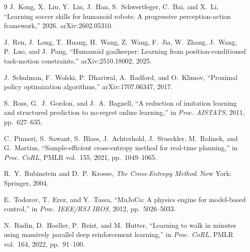 \documentclass{article}
\begin{document}
\begin{thebibliography}{9}
 J.~Kong, X.~Liu, Y.~Lin, J.~Han, S.~Schwertfeger, C.~Bai, and
X.~Li, ``Learning soccer skills for humanoid robots: A progressive
perception-action framework,'' 2026. arXiv:2602.05310.

 J.~Ren, J.~Long, T.~Huang, H.~Wang, Z.~Wang, F.~Jia, W.~Zhang,
J.~Wang, P.~Luo, and J.~Pang, ``Humanoid goalkeeper: Learning from
position-conditioned task-motion constraints,'' arXiv:2510.18002, 2025.

 J.~Schulman, F.~Wolski, P.~Dhariwal, A.~Radford, and O.~Klimov,
``Proximal policy optimization algorithms,'' arXiv:1707.06347, 2017.

 S.~Ross, G.~J.~Gordon, and J.~A.~Bagnell, ``A reduction of
imitation learning and structured prediction to no-regret online learning,'' in
\emph{Proc. AISTATS}, 2011, pp.~627--635.

 C.~Pinneri, S.~Sawant, S.~Blaes, J.~Achterhold, J.~Stueckler,
M.~Rolinek, and G.~Martius, ``Sample-efficient cross-entropy method for real-time
planning,'' in \emph{Proc. CoRL}, PMLR vol.~155, 2021, pp.~1049--1065.

 R.~Y.~Rubinstein and D.~P.~Kroese, \emph{The Cross-Entropy Method}.
New York: Springer, 2004.

 E.~Todorov, T.~Erez, and Y.~Tassa, ``MuJoCo: A physics engine
for model-based control,'' in \emph{Proc. IEEE/RSJ IROS}, 2012, pp.~5026--5033.

 N.~Rudin, D.~Hoeller, P.~Reist, and M.~Hutter, ``Learning to walk
in minutes using massively parallel deep reinforcement learning,'' in
\emph{Proc. CoRL}, PMLR vol.~164, 2022, pp.~91--100.
\end{thebibliography}
\end{document}
